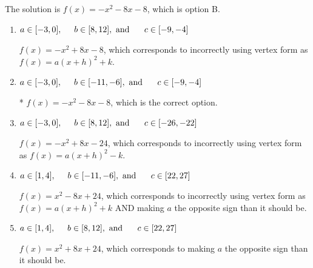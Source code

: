 \documentclass{extbook}[14pt]
\begin{document}
\begin{enumerate}
{The solution is \( f(x) = -x^{2} -8 x -8 \), which is option B.\begin{enumerate}[label=\Alph*.]
\item \( a \in [-3, 0], \hspace*{5mm} b \in [8, 12], \text{ and } \hspace*{5mm} c \in [-9, -4] \)

$f(x)=-x^{2} +8 x -8$, which corresponds to incorrectly using vertex form as $f(x) = a(x+h)^2+k$.
\item \( a \in [-3, 0], \hspace*{5mm} b \in [-11, -6], \text{ and } \hspace*{5mm} c \in [-9, -4] \)

* $f(x)=-x^{2} -8 x -8$, which is the correct option.
\item \( a \in [-3, 0], \hspace*{5mm} b \in [8, 12], \text{ and } \hspace*{5mm} c \in [-26, -22] \)

$f(x)=-x^{2} +8 x -24$, which corresponds to incorrectly using vertex form as $f(x) = a(x+h)^2 - k$.
\item \( a \in [1, 4], \hspace*{5mm} b \in [-11, -6], \text{ and } \hspace*{5mm} c \in [22, 27] \)

$f(x)=x^{2} -8 x + 24$, which corresponds to incorrectly using vertex form as $f(x) = a(x+h)^2+k$ AND making $a$ the opposite sign than it should be.
\item \( a \in [1, 4], \hspace*{5mm} b \in [8, 12], \text{ and } \hspace*{5mm} c \in [22, 27] \)

$f(x)=x^{2} +8 x + 24$, which corresponds to making $a$ the opposite sign than it should be.
\end{enumerate}

}
\end{enumerate}
\end{document}
